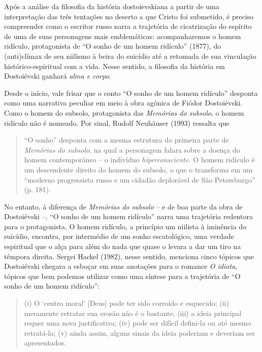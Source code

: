 Após a análise da filosofia da história dostoievskiana a partir de uma
interpretação das três tentações no deserto a que Cristo foi submetido,
é preciso compreender como o escritor russo narra a trajetória de
cicatrização do espírito de uma de suas personagens mais emblemáticas:
acompanharemos o homem ridículo, protagonista de ``O sonho de um homem
ridículo'' (1877), do (anti)clímax de seu niilismo à beira do suicídio
até a retomada de sua vinculação histórico-espiritual com a vida. Nesse
sentido, a filosofia da história em Dostoiévski ganhará \emph{alma e
corpo}.

Desde o início, vale frisar que o conto ``O sonho de um homem ridículo''
desponta como uma narrativa peculiar em meio à obra agônica de Fiódor
Dostoiévski. Como o homem do subsolo, protagonista das \emph{Memórias do
subsolo}, o homem ridículo não é nomeado. Por sinal, Rudolf Neuhäuser
(1993) ressalta que

\begin{quote}
``O sonho'' desponta com a mesma estrutura da primeira parte de
\emph{Memórias do subsolo}, na qual a personagem falara sobre a doença
do homem contemporâneo -- o indivíduo \emph{hiperconsciente.} O homem
ridículo é um descendente direito do homem do subsolo, o que o
transforma em um ``moderno progressista russo e um cidadão deplorável de
São Petersburgo'' (p. 181).
\end{quote}

No entanto, à diferença de \emph{Memórias do subsolo} -- e de boa parte
da obra de Dostoiévski --, ``O sonho de um homem ridículo'' narra uma
trajetória redentora para o protagonista. O homem ridículo, a princípio
um niilista à iminência do suicídio, encontra, por intermédio de um
sonho escatológico, uma verdade espiritual que o alça para além do nada
que quase o levara a dar um tiro na têmpora direita. Sergei Hackel
(1982), nesse sentido, menciona cinco tópicos que Dostoiévski chegara a
esboçar em suas anotações para o romance \emph{O idiota}, tópicos que
bem podemos utilizar como uma síntese para a trajetória de ``O sonho de
um homem ridículo'':

\begin{quote}
(i) O `centro moral' {[}Deus{]} pode ter sido corroído e esquecido; (ii)
meramente retratar sua erosão não é o bastante; (iii) a ideia principal
requer uma nova justificativa; (iv) pode ser difícil defini-la ou até
mesmo retratá-la; (v) ainda assim, alguns sinais da ideia poderiam e
deveriam ser apresentados.
\end{quote}

